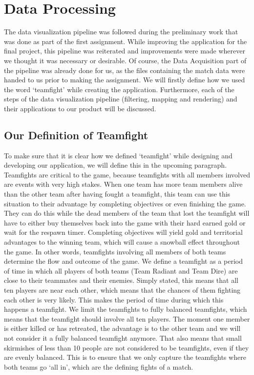 \documentclass[11pt,twoside,a4paper]{article}
\begin{document}
\section{Data Processing}
\label{sec:dataproc}
The data visualization pipeline was followed during the preliminary work that was done as part of the first assignment. While improving the application for the final project, this pipeline was reiterated and improvements were made wherever we thought it was necessary or desirable. Of course, the Data Acquisition part of the pipeline was already done for us, as the files containing the match data were handed to us prior to making the assignment. We will firstly define how we used the word `teamfight' while creating the application. Furthermore, each of the steps of the data visualization pipeline (filtering, mapping and rendering) and their applications to our product will be discussed.

\subsection{Our Definition of Teamfight}
To make sure that it is clear how we defined `teamfight' while designing and developing our application, we will define this in the upcoming paragraph. Teamfights are critical to the game, because teamfights with all members involved are events with very high stakes. When one team has more team members alive than the other team after having fought a teamfight, this team can use this situation to their advantage by completing objectives or even finishing the game. They can do this while the dead members of the team that lost the teamfight will have to either buy themselves back into the game with their hard earned gold or wait for the respawn timer. Completing objectives will yield gold and territorial advantages to the winning team, which will cause a snowball effect throughout the game. In other words, teamfights involving all members of both teams determine the flow and outcome of the game.
\newline\newline
We define a teamfight as a period of time in which all players of both teams (Team Radiant and Team Dire) are close to their teammates and their enemies. Simply stated, this means that all ten players are near each other, which means that the chances of them fighting each other is very likely. This makes the period of time during which this happens a teamfight. We limit the teamfights to fully balanced teamfights, which means that the teamfight should involve all ten players. The moment one member is either killed or has retreated, the advantage is to the other team and we will not consider it a fully balanced teamfight anymore. That also means that small skirmishes of less than 10 people are not considered to be teamfights, even if they are evenly balanced. This is to ensure that we only capture the teamfights where both teams go `all in', which are the defining fights of a match.
\end{document}
